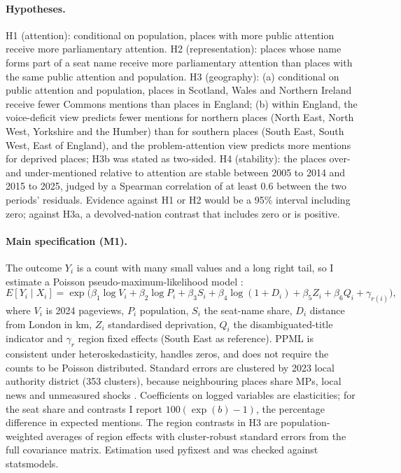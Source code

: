 \documentclass[11pt,a4paper]{article}
\begin{document}
\paragraph{Hypotheses.} H1 (attention): conditional on population, places with more public attention receive more parliamentary attention. H2 (representation): places whose name forms part of a seat name receive more parliamentary attention than places with the same public attention and population. H3 (geography): (a) conditional on public attention and population, places in Scotland, Wales and Northern Ireland receive fewer Commons mentions than places in England; (b) within England, the voice-deficit view predicts fewer mentions for northern places (North East, North West, Yorkshire and the Humber) than for southern places (South East, South West, East of England), and the problem-attention view predicts more mentions for deprived places; H3b was stated as two-sided. H4 (stability): the places over- and under-mentioned relative to attention are stable between 2005 to 2014 and 2015 to 2025, judged by a Spearman correlation of at least 0.6 between the two periods' residuals. Evidence against H1 or H2 would be a 95\% interval including zero; against H3a, a devolved-nation contrast that includes zero or is positive.

\paragraph{Main specification (M1).} The outcome $Y_i$ is a count with many small values and a long right tail, so I estimate a Poisson pseudo-maximum-likelihood model \citep{SantosSilvaTenreyro2006}:
\begin{equation}
E[Y_i \mid X_i] = \exp\big(\beta_1 \log V_i + \beta_2 \log P_i + \beta_3 S_i + \beta_4 \log(1 + D_i) + \beta_5 Z_i + \beta_6 Q_i + \gamma_{r(i)}\big),
\end{equation}
where $V_i$ is 2024 pageviews, $P_i$ population, $S_i$ the seat-name share, $D_i$ distance from London in km, $Z_i$ standardised deprivation, $Q_i$ the disambiguated-title indicator and $\gamma_r$ region fixed effects (South East as reference). PPML is consistent under heteroskedasticity, handles zeros, and does not require the counts to be Poisson distributed. Standard errors are clustered by 2023 local authority district (353 clusters), because neighbouring places share MPs, local news and unmeasured shocks \citep{CameronMiller2015,Abadie2023}. Coefficients on logged variables are elasticities; for the seat share and contrasts I report $100(\exp(b)-1)$, the percentage difference in expected mentions. The region contrasts in H3 are population-weighted averages of region effects with cluster-robust standard errors from the full covariance matrix. Estimation used pyfixest and was checked against statsmodels.
\end{document}
